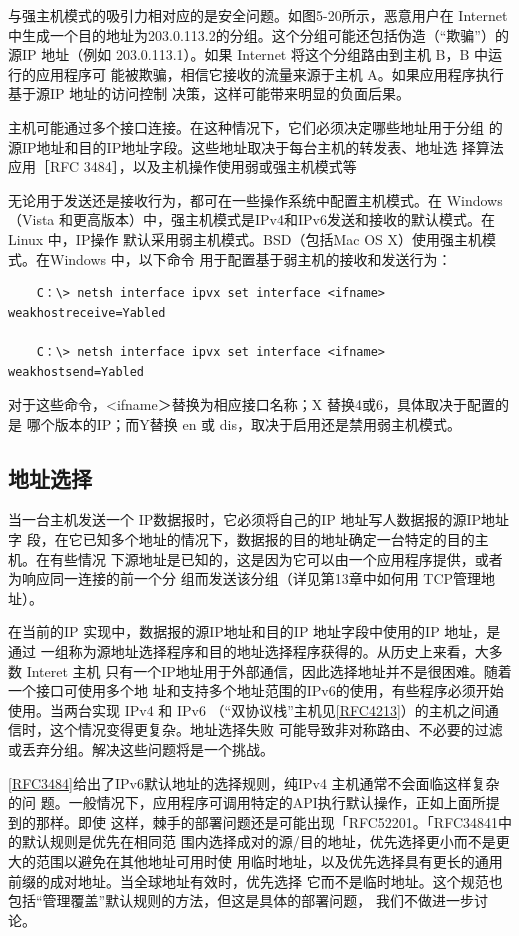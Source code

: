 与强主机模式的吸引力相对应的是安全问题。如图5-20所示，恶意用户在 Internet
中生成一个目的地址为203.0.113.2的分组。这个分组可能还包括伪造（“欺骗”）的源IP
地址（例如 203.0.113.1）。如果 Internet 将这个分组路由到主机 B，B 中运行的应用程序可
能被欺骗，相信它接收的流量来源于主机 A。如果应用程序执行基于源IP 地址的访问控制
决策，这样可能带来明显的负面后果。

主机可能通过多个接口连接。在这种情况下，它们必须决定哪些地址用于分组
的源IP地址和目的IP地址字段。这些地址取决于每台主机的转发表、地址选
择算法应用［RFC 3484］，以及主机操作使用弱或强主机模式等

无论用于发送还是接收行为，都可在一些操作系统中配置主机模式。在 Windows （Vista
和更高版本）中，强主机模式是IPv4和IPv6发送和接收的默认模式。在 Linux 中，IP操作
默认采用弱主机模式。BSD（包括Mac OS X）使用强主机模式。在Windows 中，以下命令
用于配置基于弱主机的接收和发送行为：

\begin{verbatim}
    C：\> netsh interface ipvx set interface <ifname> weakhostreceive=Yabled
    
    C：\> netsh interface ipvx set interface <ifname> weakhostsend=Yabled
\end{verbatim}

对于这些命令，<ifname＞替换为相应接口名称；X 替换4或6，具体取决于配置的是
哪个版本的IP；而Y替换 en 或 dis，取决于启用还是禁用弱主机模式。

\subsection{地址选择}

当一台主机发送一个 IP数据报时，它必须将自己的IP 地址写人数据报的源IP地址字
段，在它已知多个地址的情况下，数据报的目的地址确定一台特定的目的主机。在有些情况
下源地址是已知的，这是因为它可以由一个应用程序提供，或者为响应同一连接的前一个分
组而发送该分组（详见第13章中如何用 TCP管理地址）。

在当前的IP 实现中，数据报的源IP地址和目的IP 地址字段中使用的IP 地址，是通过
一组称为源地址选择程序和目的地址选择程序获得的。从历史上来看，大多数 Interet 主机
只有一个IP地址用于外部通信，因此选择地址并不是很困难。随着一个接口可使用多个地
址和支持多个地址范围的IPv6的使用，有些程序必须开始使用。当两台实现 IPv4 和 IPv6
（“双协议栈”主机见\href{https://www.rfc-editor.org/rfc/rfc4213}{[RFC4213]}）的主机之间通信时，这个情况变得更复杂。地址选择失败
可能导致非对称路由、不必要的过滤或丢弃分组。解决这些问题将是一个挑战。

\href{https://www.rfc-editor.org/rfc/rfc3484}{[RFC3484]}给出了IPv6默认地址的选择规则，纯IPv4 主机通常不会面临这样复杂的问
题。一般情况下，应用程序可调用特定的API执行默认操作，正如上面所提到的那样。即使
这样，棘手的部署问题还是可能出现「RFC52201。「RFC34841中的默认规则是优先在相同范
围内选择成对的源/目的地址，优先选择更小而不是更大的范围以避免在其他地址可用时使
用临时地址，以及优先选择具有更长的通用前缀的成对地址。当全球地址有效时，优先选择
它而不是临时地址。这个规范也包括“管理覆盖”默认规则的方法，但这是具体的部署问题，
我们不做进一步讨论。

